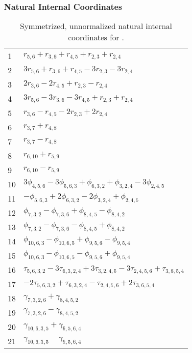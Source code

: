 \documentclass[10pt,oneside]{article}
\begin{document}
\subsubsection*{Natural Internal Coordinates}
\begin{table}[h!]
\centering
\caption{Symmetrized, unnormalized natural internal coordinates for .}
\small
\begin{tabular}{ll}
  1   & $r_{5,6} + r_{3,6} + r_{4,5} + r_{2,3} + r_{2,4}$ \\
  2   & $3r_{5,6} + r_{3,6} + r_{4,5} - 3r_{2,3} - 3r_{2,4}$ \\
  3   & $2r_{3,6} - 2r_{4,5} + r_{2,3} - r_{2,4}$ \\
  4   & $3r_{5,6} - 3r_{3,6} - 3r_{4,5} + r_{2,3} + r_{2,4}$ \\
  5   & $r_{3,6} - r_{4,5} - 2r_{2,3} + 2r_{2,4}$ \\
  6   & $r_{3,7} + r_{4,8}$ \\
  7   & $r_{3,7} - r_{4,8}$ \\
  8   & $r_{6,10} + r_{5,9}$ \\
  9   & $r_{6,10} - r_{5,9}$ \\
  10  & $3\phi_{4,5,6} - 3\phi_{5,6,3} + \phi_{6,3,2} + \phi_{3,2,4} - 3\phi_{2,4,5}$ \\
  11  & $-\phi_{5,6,3} + 2\phi_{6,3,2} - 2\phi_{3,2,4} + \phi_{2,4,5}$ \\
  12  & $\phi_{7,3,2} - \phi_{7,3,6} + \phi_{8,4,5} - \phi_{8,4,2}$ \\
  13  & $\phi_{7,3,2} - \phi_{7,3,6} - \phi_{8,4,5} + \phi_{8,4,2}$ \\
  14  & $\phi_{10,6,3} - \phi_{10,6,5} + \phi_{9,5,6} - \phi_{9,5,4}$ \\
  15  & $\phi_{10,6,3} - \phi_{10,6,5} - \phi_{9,5,6} + \phi_{9,5,4}$ \\
  16  & $\tau_{5,6,3,2} - 3\tau_{6,3,2,4} + 3\tau_{3,2,4,5} - 3\tau_{2,4,5,6} + \tau_{3,6,5,4}$ \\
  17  & $-2\tau_{5,6,3,2} + \tau_{6,3,2,4} - \tau_{2,4,5,6} + 2\tau_{3,6,5,4}$ \\
  18  & $\gamma_{7,3,2,6} + \gamma_{8,4,5,2}$ \\
  19  & $\gamma_{7,3,2,6} - \gamma_{8,4,5,2}$ \\
  20  & $\gamma_{10,6,3,5} + \gamma_{9,5,6,4}$ \\
  21  & $\gamma_{10,6,3,5} - \gamma_{9,5,6,4}$ \\
\end{tabular}
\end{table}
\end{document}

